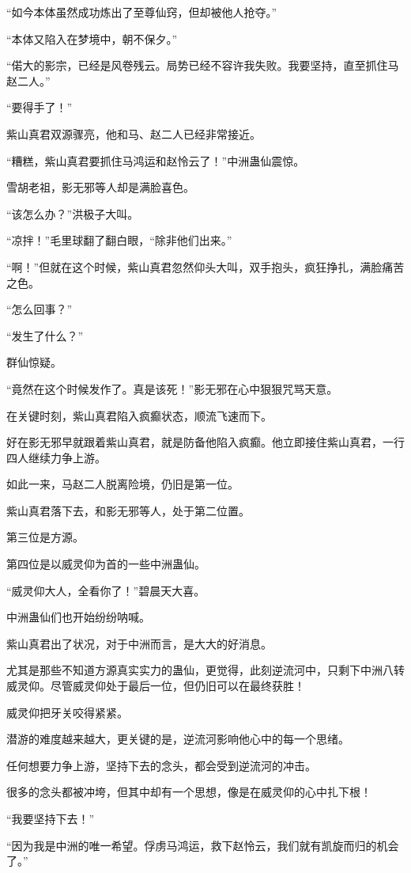 \begin{this_body}
“如今本体虽然成功炼出了至尊仙窍，但却被他人抢夺。”

“本体又陷入在梦境中，朝不保夕。”

“偌大的影宗，已经是风卷残云。局势已经不容许我失败。我要坚持，直至抓住马赵二人。”

“要得手了！”

紫山真君双源骤亮，他和马、赵二人已经非常接近。

“糟糕，紫山真君要抓住马鸿运和赵怜云了！”中洲蛊仙震惊。

雪胡老祖，影无邪等人却是满脸喜色。

“该怎么办？”洪极子大叫。

“凉拌！”毛里球翻了翻白眼，“除非他们出来。”

“啊！”但就在这个时候，紫山真君忽然仰头大叫，双手抱头，疯狂挣扎，满脸痛苦之色。

“怎么回事？”

“发生了什么？”

群仙惊疑。

“竟然在这个时候发作了。真是该死！”影无邪在心中狠狠咒骂天意。

在关键时刻，紫山真君陷入疯癫状态，顺流飞速而下。

好在影无邪早就跟着紫山真君，就是防备他陷入疯癫。他立即接住紫山真君，一行四人继续力争上游。

如此一来，马赵二人脱离险境，仍旧是第一位。

紫山真君落下去，和影无邪等人，处于第二位置。

第三位是方源。

第四位是以威灵仰为首的一些中洲蛊仙。

“威灵仰大人，全看你了！”碧晨天大喜。

中洲蛊仙们也开始纷纷呐喊。

紫山真君出了状况，对于中洲而言，是大大的好消息。

尤其是那些不知道方源真实实力的蛊仙，更觉得，此刻逆流河中，只剩下中洲八转威灵仰。尽管威灵仰处于最后一位，但仍旧可以在最终获胜！

威灵仰把牙关咬得紧紧。

潜游的难度越来越大，更关键的是，逆流河影响他心中的每一个思绪。

任何想要力争上游，坚持下去的念头，都会受到逆流河的冲击。

很多的念头都被冲垮，但其中却有一个思想，像是在威灵仰的心中扎下根！

“我要坚持下去！”

“因为我是中洲的唯一希望。俘虏马鸿运，救下赵怜云，我们就有凯旋而归的机会了。”


\end{this_body}
